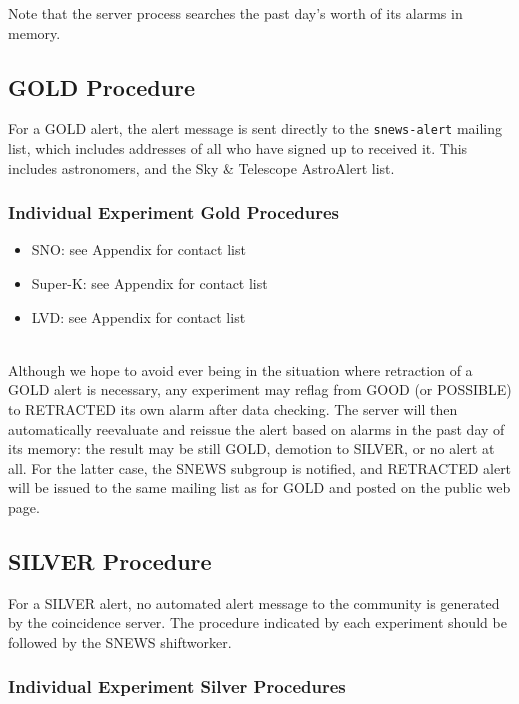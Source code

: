 \documentclass{article}
\begin{document}
Note that the server process searches the past day's worth of its
alarms in memory.  


\subsection{GOLD Procedure}\label{GOLD}

For a GOLD alert, the alert message is sent directly to the 
{\tt snews-alert} mailing list, which includes addresses of all
who have signed up to received it. This includes astronomers,
and the Sky \& Telescope AstroAlert list. 

\subsubsection{Individual Experiment Gold Procedures}

\begin{itemize}

\item SNO: see Appendix for contact list
\item Super-K: see Appendix for contact list
\item LVD: see Appendix for contact list

\end{itemize}


\\ Although we hope
to avoid ever being in the situation where retraction of a GOLD alert
is necessary, any experiment may reflag from GOOD (or POSSIBLE) to RETRACTED its
own alarm after data checking.  The server will then automatically
reevaluate and reissue the alert based on alarms in the past day of its
memory: the result may be still GOLD, demotion to SILVER, or no alert
at all.  For the latter case, the SNEWS subgroup is 
notified, and RETRACTED alert will be issued to the
same mailing list as for GOLD and posted on the public web page.

\subsection{SILVER Procedure}\label{SILVER}
For a SILVER alert, no automated alert message to the community
is generated by the coincidence server. 
The procedure indicated by each experiment should be followed by
the SNEWS shiftworker.\\

\subsubsection{Individual Experiment Silver Procedures}
\end{document}
